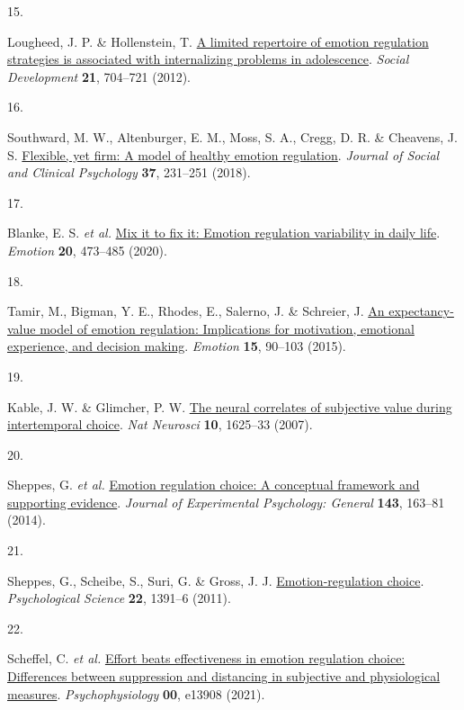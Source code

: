 \documentclass[
  man,floatsintext]{apa6}
\newlength{\cslhangindent}
\newlength{\csllabelwidth}
\newlength{\cslentryspacingunit} %
\newenvironment{CSLReferences}[2] %
 {%
  \setlength{\parindent}{0pt}
  \ifodd #1
  \let\oldpar\par
  \def\par{\hangindent=\cslhangindent\oldpar}
  \fi
  \setlength{\parskip}{#2\cslentryspacingunit}
 }%
 {}
\newcommand{\CSLLeftMargin}[1]{\parbox[t]{\csllabelwidth}{#1}}
\newcommand{\CSLRightInline}[1]{\parbox[t]{\linewidth - \csllabelwidth}{#1}\break}
\begin{document}
\begin{CSLReferences}{0}{0}
\leavevmode{}%
\CSLLeftMargin{15. }%
\CSLRightInline{Lougheed, J. P. \& Hollenstein, T. \href{https://doi.org/10.1111/j.1467-9507.2012.00663.x}{A limited repertoire of emotion regulation strategies is associated with internalizing problems in adolescence}. \emph{Social Development} \textbf{21}, 704--721 (2012).}

\leavevmode{}%
\CSLLeftMargin{16. }%
\CSLRightInline{Southward, M. W., Altenburger, E. M., Moss, S. A., Cregg, D. R. \& Cheavens, J. S. \href{https://doi.org/DOI\%2010.1521/jscp.2018.37.4.231}{Flexible, yet firm: A model of healthy emotion regulation}. \emph{Journal of Social and Clinical Psychology} \textbf{37}, 231--251 (2018).}

\leavevmode{}%
\CSLLeftMargin{17. }%
\CSLRightInline{Blanke, E. S. \emph{et al.} \href{https://doi.org/10.1037/emo0000566}{Mix it to fix it: Emotion regulation variability in daily life}. \emph{Emotion} \textbf{20}, 473--485 (2020).}

\leavevmode{}%
\CSLLeftMargin{18. }%
\CSLRightInline{Tamir, M., Bigman, Y. E., Rhodes, E., Salerno, J. \& Schreier, J. \href{https://doi.org/10.1037/emo0000021}{An expectancy-value model of emotion regulation: Implications for motivation, emotional experience, and decision making}. \emph{Emotion} \textbf{15}, 90--103 (2015).}

\leavevmode{}%
\CSLLeftMargin{19. }%
\CSLRightInline{Kable, J. W. \& Glimcher, P. W. \href{https://doi.org/10.1038/nn2007}{The neural correlates of subjective value during intertemporal choice}. \emph{Nat Neurosci} \textbf{10}, 1625--33 (2007).}

\leavevmode{}%
\CSLLeftMargin{20. }%
\CSLRightInline{Sheppes, G. \emph{et al.} \href{https://doi.org/10.1037/a0030831}{Emotion regulation choice: A conceptual framework and supporting evidence}. \emph{Journal of Experimental Psychology: General} \textbf{143}, 163--81 (2014).}

\leavevmode{}%
\CSLLeftMargin{21. }%
\CSLRightInline{Sheppes, G., Scheibe, S., Suri, G. \& Gross, J. J. \href{https://doi.org/10.1177/0956797611418350}{Emotion-regulation choice}. \emph{Psychological Science} \textbf{22}, 1391--6 (2011).}

\leavevmode{}%
\CSLLeftMargin{22. }%
\CSLRightInline{Scheffel, C. \emph{et al.} \href{https://doi.org/10.1111/psyp.13908}{Effort beats effectiveness in emotion regulation choice: Differences between suppression and distancing in subjective and physiological measures}. \emph{Psychophysiology} \textbf{00}, e13908 (2021).}


\end{CSLReferences}
\end{document}
